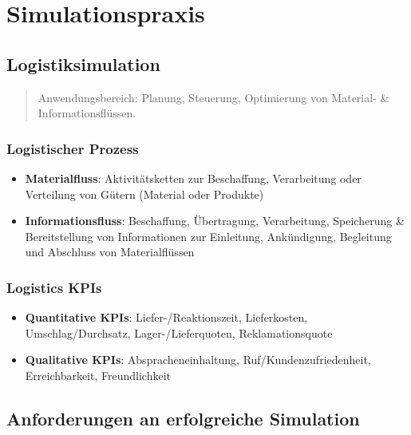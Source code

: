 \documentclass{article}
\begin{document}
\setcounter{section}{5}
\section{Simulationspraxis}
\subsection{Logistiksimulation}
\begin{quote}Anwendungsbereich: Planung, Steuerung, Optimierung von Material- \& Informationsflüssen.\end{quote}

\subsubsection{Logistischer Prozess}
\begin{itemize}
  \item \textbf{Materialfluss}: Aktivitätsketten zur Beschaffung, Verarbeitung oder Verteilung von Gütern (Material oder Produkte)
  \item \textbf{Informationsfluss}: Beschaffung, Übertragung, Verarbeitung, Speicherung \& Bereitstellung von Informationen zur Einleitung, Ankündigung, Begleitung und Abschluss von Materialflüssen
\end{itemize}

\subsubsection{Logistics KPIs}
\begin{itemize}
  \item \textbf{Quantitative KPIs}: Liefer-/Reaktionszeit, Lieferkosten, Umschlag/Durchsatz, Lager-/Lieferquoten, Reklamationsquote
  \item \textbf{Qualitative KPIs}: Abspracheneinhaltung, Ruf/Kundenzufriedenheit, Erreichbarkeit, Freundlichkeit
\end{itemize}


\subsection{Anforderungen an erfolgreiche Simulation}
\end{document}

